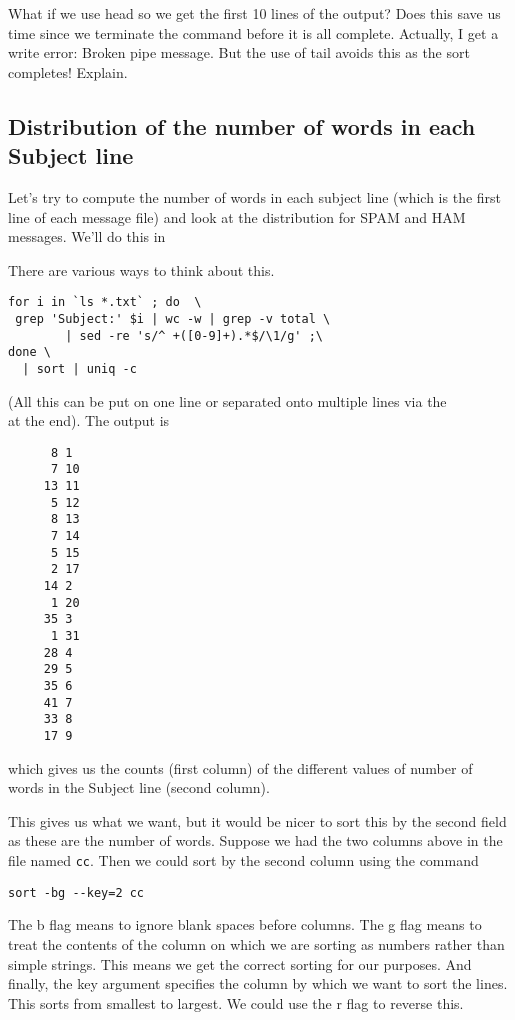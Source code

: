 What if we use head so we get the first 10 lines of the output?  Does
this save us time since we terminate the command before it is all
complete.  Actually, I get a write error: Broken pipe message.  But
the use of tail avoids this as the sort completes!  Explain.

\subsection{Distribution of the number of words in each Subject line}
Let's try to compute the number of words in each subject line (which
is the first line of each message file) and look at the distribution
for SPAM and HAM messages.
We'll do this in 



There are various ways to think about this.
\begin{verbatim}
for i in `ls *.txt` ; do  \
 grep 'Subject:' $i | wc -w | grep -v total \
        | sed -re 's/^ +([0-9]+).*$/\1/g' ;\
done \
  | sort | uniq -c
\end{verbatim}
(All this can be put on one line or separated onto multiple lines via
the
\\ at the end).
The output is
\begin{verbatim}
      8 1
      7 10
     13 11
      5 12
      8 13
      7 14
      5 15
      2 17
     14 2
      1 20
     35 3
      1 31
     28 4
     29 5
     35 6
     41 7
     33 8
     17 9
\end{verbatim}
which gives us the counts (first column) of the different values
of number of words in the Subject line (second column).

This gives us what we want, but it would be nicer
to sort this by the second field as these are the number
of words.
Suppose we had the two columns above in the file
named \texttt{cc}.
Then we could sort by the second column
using the command
\begin{verbatim}
sort -bg --key=2 cc
\end{verbatim}
The b flag means to ignore blank spaces before
columns.  The g flag means to treat the contents of the column
on which we are sorting as numbers rather than simple strings.
This means we get the correct sorting for our purposes.
And finally, the key argument specifies the column by which
we want to sort the lines.
This sorts from smallest to largest.
We could use the r flag to reverse this.



